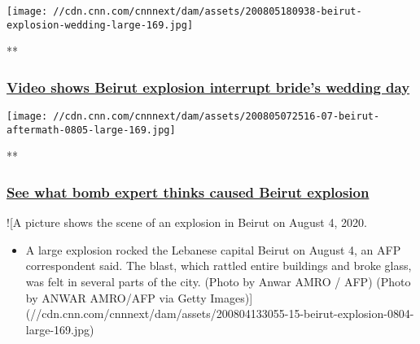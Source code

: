 \href{/videos/world/2020/08/05/beirut-explosion-wedding-video-zw-orig.cnn/video/playlists/beirut-explosion/}{}

\texttt{[image: //cdn.cnn.com/cnnnext/dam/assets/200805180938-beirut-explosion-wedding-large-169.jpg]}

**

\hypertarget{video-shows-beirut-explosion-interrupt-brides-wedding-day}{%
\subsubsection{\texorpdfstring{\href{/videos/world/2020/08/05/beirut-explosion-wedding-video-zw-orig.cnn/video/playlists/beirut-explosion/}{Video
shows Beirut explosion interrupt bride's wedding
day}}{Video shows Beirut explosion interrupt bride's wedding day}}\label{video-shows-beirut-explosion-interrupt-brides-wedding-day}}

\href{/videos/world/2020/08/05/ammonium-nitrate-beirut-lebanon-explosion-sam-kiley-pkg-vpx.cnn/video/playlists/beirut-explosion/}{}

\texttt{[image: //cdn.cnn.com/cnnnext/dam/assets/200805072516-07-beirut-aftermath-0805-large-169.jpg]}

**

\hypertarget{see-what-bomb-expert-thinks-caused-beirut-explosion}{%
\subsubsection{\texorpdfstring{\href{/videos/world/2020/08/05/ammonium-nitrate-beirut-lebanon-explosion-sam-kiley-pkg-vpx.cnn/video/playlists/beirut-explosion/}{See
what bomb expert thinks caused Beirut
explosion}}{See what bomb expert thinks caused Beirut explosion}}\label{see-what-bomb-expert-thinks-caused-beirut-explosion}}

\href{/videos/world/2020/08/04/beirut-explosion-video-mss-orig.cnn/video/playlists/beirut-explosion/}{}

!{[}A picture shows the scene of an explosion in Beirut on August 4,
2020.

\begin{itemize}
\tightlist
\item
  A large explosion rocked the Lebanese capital Beirut on August 4, an
  AFP correspondent said. The blast, which rattled entire buildings and
  broke glass, was felt in several parts of the city. (Photo by Anwar
  AMRO / AFP) (Photo by ANWAR AMRO/AFP via Getty
  Images){]}(//cdn.cnn.com/cnnnext/dam/assets/200804133055-15-beirut-explosion-0804-large-169.jpg)
\end{itemize}

